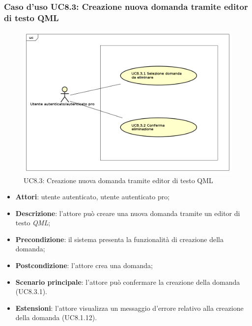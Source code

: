 





	

	\subsubsection{Caso d'uso UC8.3: Creazione nuova domanda tramite editor di testo QML}
	\label{UC8.3}
	\begin{figure}[h]
		\centering
		\includegraphics[scale=0.45,keepaspectratio]{UML/UC8_3.png}
		\caption{UC8.3: Creazione nuova domanda tramite editor di testo QML}
	\end{figure}
	\FloatBarrier
	\begin{itemize}
		\item
		\textbf{Attori}: utente autenticato, utente autenticato pro;
		\item		
		\textbf{Descrizione}: l'attore può creare una nuova domanda tramite un editor di testo \textit{QML};
		\item
		\textbf{Precondizione}: il sistema presenta la funzionalità di creazione della domanda;
		\item
		\textbf{Postcondizione}: l'attore crea una domanda;		
		\item
		\textbf{Scenario principale}: l'attore può confermare la creazione della domanda (UC8.3.1).
		\item
		\textbf{Estensioni}: l'attore visualizza un messaggio d'errore relativo alla creazione della domanda (UC8.1.12).
	\end{itemize}	
	
